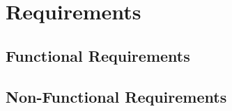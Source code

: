 
\section{Requirements}
\label{sec:requirements}


\subsection{Functional Requirements}
\label{sub:functional_requirements}


\subsection{Non-Functional Requirements}
\label{sub:non_functional_requirements}

